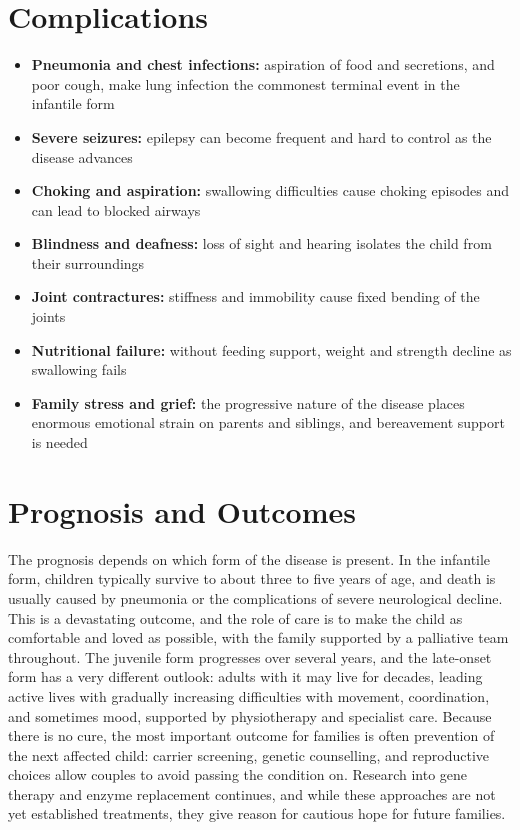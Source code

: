 \section*{Complications}
\begin{itemize}
    \item \textbf{Pneumonia and chest infections:} aspiration of food and secretions, and poor cough, make lung infection the commonest terminal event in the infantile form
    \item \textbf{Severe seizures:} epilepsy can become frequent and hard to control as the disease advances
    \item \textbf{Choking and aspiration:} swallowing difficulties cause choking episodes and can lead to blocked airways
    \item \textbf{Blindness and deafness:} loss of sight and hearing isolates the child from their surroundings
    \item \textbf{Joint contractures:} stiffness and immobility cause fixed bending of the joints
    \item \textbf{Nutritional failure:} without feeding support, weight and strength decline as swallowing fails
    \item \textbf{Family stress and grief:} the progressive nature of the disease places enormous emotional strain on parents and siblings, and bereavement support is needed
\end{itemize}

\section*{Prognosis and Outcomes}
The prognosis depends on which form of the disease is present. In the infantile form, children typically survive to about three to five years of age, and death is usually caused by pneumonia or the complications of severe neurological decline. This is a devastating outcome, and the role of care is to make the child as comfortable and loved as possible, with the family supported by a palliative team throughout. The juvenile form progresses over several years, and the late-onset form has a very different outlook: adults with it may live for decades, leading active lives with gradually increasing difficulties with movement, coordination, and sometimes mood, supported by physiotherapy and specialist care. Because there is no cure, the most important outcome for families is often prevention of the next affected child: carrier screening, genetic counselling, and reproductive choices allow couples to avoid passing the condition on. Research into gene therapy and enzyme replacement continues, and while these approaches are not yet established treatments, they give reason for cautious hope for future families.

